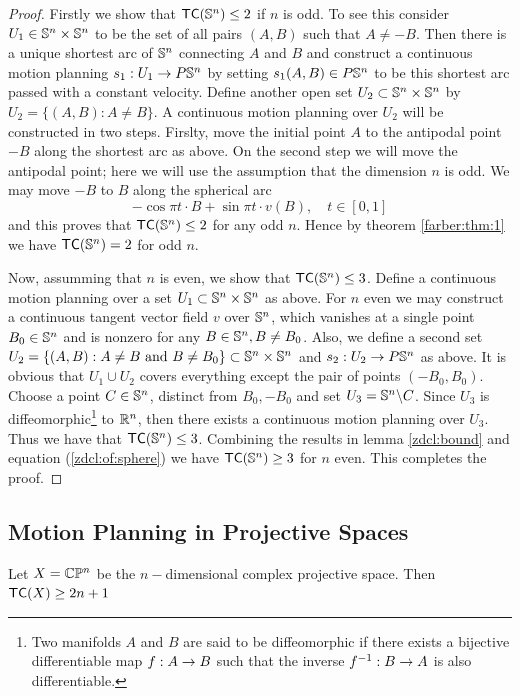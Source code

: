 \begin{proof}
    Firstly we show that $\textsf{TC}(\mathbb{S}^n) \le 2$ if $n$ is odd. To see this consider $U_1 \in \mathbb{S}^n \times \mathbb{S}^n$ to be the set of all pairs $(A,B)$ such that $A \neq -B$. Then there is a unique shortest arc of $\mathbb{S}^n$ connecting $A$ and $B$ and construct a continuous motion planning $s_1: U_1 \rightarrow P\mathbb{S}^n$ by setting $s_1(A,B) \in P\mathbb{S}^n$ to be this shortest arc passed with a constant velocity. Define another open set $U_2 \subset \mathbb{S}^n \times \mathbb{S}^n$ by $U_2 = \{(A,B) : A \neq B\}$. A continuous motion planning over $U_2$ will be constructed in two steps. Firslty, move the initial point $A$ to the antipodal point $-B$ along the shortest arc as above. On the second step we will move the antipodal point; here we will use the assumption that
    the dimension $n$ is odd. We may move $-B$ to $B$ along the spherical arc
    \[
        - \cos \pi t \cdot B + \sin \pi t \cdot v(B), \quad t \in [0,1]
    \]
    and this proves that $\textsf{TC}(\mathbb{S}^n) \le 2$ for any odd $n$. Hence by theorem \ref{farber:thm:1} we have $\textsf{TC}(\mathbb{S}^n) = 2$ for odd $n$.

    Now, assumming that $n$ is even, we show that $\textsf{TC}(\mathbb{S}^n) \le 3$. Define a continuous motion planning over a set $U_1 \subset \mathbb{S}^n \times \mathbb{S}^n$ as above. For $n$ even we may construct a continuous tangent vector field $v$ over $\mathbb{S}^n$, which vanishes at a single point $B_0 \in \mathbb{S}^n$ and is nonzero for any $B \in \mathbb{S}^n, B \neq B_0$. Also, we define a second set $U_2 = \{(A,B) : A \neq B \text{ and } B \neq B_0\} \subset \mathbb{S}^n \times \mathbb{S}^n$ and $s_2 : U_2 \rightarrow P\mathbb{S}^n$ as above. It is obvious that $U_1 \cup U_2$ covers everything except the pair of points $(-B_0, B_0)$. Choose a point $C \in \mathbb{S}^n$, distinct from $B_0, -B_0$ and set $U_3 = \mathbb{S}^n \backslash C$.
    Since $U_3$ is diffeomorphic\footnote{Two manifolds $A$ and $B$ are said to be diffeomorphic if there exists a bijective differentiable map $f: A \rightarrow B$ such that the inverse $f^{-1} : B \rightarrow A$ is also differentiable.} to $\mathbb{R}^n$, then there exists a continuous motion planning over $U_3$. Thus we have that $\textsf{TC}(\mathbb{S}^n) \le 3$. Combining the results in lemma \ref{zdcl:bound} and equation (\ref{zdcl:of:sphere}) we have $\textsf{TC}(\mathbb{S}^n) \ge 3$ for $n$ even. This completes the proof.
\end{proof}

\subsection{Motion Planning in Projective Spaces }
\begin{thm}
    Let $X = \mathbb{C}\mathbb{P}^n$ be the $n-$dimensional complex projective space. Then $\textsf{TC}(X) \ge 2n + 1$
\end{thm}

